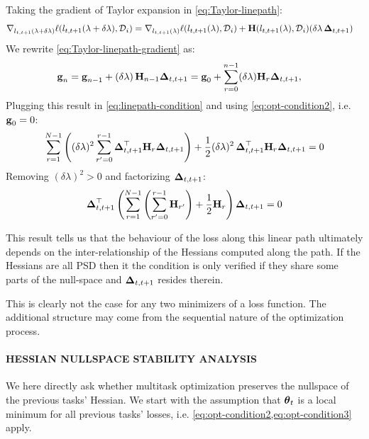 \documentclass{article} %
\newcommand{\hessian}{\vH}
\begin{document}
{Taking the gradient of Taylor expansion in \cref{eq:Taylor-linepath}:
\begin{align}
\label{eq:Taylor-linepath-gradient}
    \grad_{l_{t,t+1}(\lambda + \delta\lambda)}\loss(l_{t,t+1}(\lambda + \delta\lambda), \data_{i}) =
    & \hspace{3pt} \grad_{l_{t,t+1}(\lambda)}\loss(l_{t,t+1}(\lambda), \data_{i}) + \hessian(l_{t,t+1}(\lambda), \data_{i})(\delta\lambda\,\vDelta_{t,t+1})
\end{align}
We rewrite \cref{eq:Taylor-linepath-gradient} as:
\begin{align}
    \vg_n 
    &=  \vg_{n-1} + (\delta\lambda)\,\hessian_{n-1}\vDelta_{t,t+1} = \vg_0 + \sum_{r=0}^{n-1} (\delta\lambda)\hessian_r\vDelta_{t,t+1},
\end{align}
Plugging this result in \cref{eq:linepath-condition} and using \cref{eq:opt-condition2}, i.e. $\mbox{$\mbox{$\mathbf{g}$}$}_0=0$:
\begin{align}
    \sum_{r=1}^{N-1} \rnd{(\delta\lambda)^2 \sum_{r'=0}^{r-1} \vDelta_{t,t+1}^\top\hessian_r\vDelta_{t,t+1}} + \frac{1}{2}(\delta\lambda)^2\,\vDelta_{t,t+1}^\top\hessian_r\vDelta_{t,t+1} = 0
\end{align}
Removing $(\delta\lambda)^2>0$ and factorizing $\mbox{$\mbox{$\boldsymbol{\Delta}$}$}_{t,t+1}$:
\begin{align}
    \vDelta_{t,t+1}^\top \rnd{ \sum_{r=1}^{N-1} \rnd{ \sum_{r'=0}^{r-1} \hessian_{r'}} + \frac{1}{2}\hessian_r} \vDelta_{t,t+1} = 0
\end{align}
}

This result tells us that the behaviour of the loss along this linear path ultimately depends on the inter-relationship of the Hessians computed along the path. If the Hessians are all PSD then it the condition is only verified if they share some parts of the null-space and $\mbox{$\mbox{$\boldsymbol{\Delta}$}$}_{t,t+1}$ resides therein.

This is clearly not the case for any two minimizers of a loss function. The additional structure may come from the sequential nature of the optimization process. 



\paragraph{HESSIAN NULLSPACE STABILITY ANALYSIS}
We here directly ask whether multitask optimization preserves the nullspace of the previous tasks' Hessian. We start with the assumption that $\mbox{$\mbox{$\boldsymbol{\theta}$}$}_t$ is a local minimum for all previous tasks' losses, i.e. \cref{eq:opt-condition2,eq:opt-condition3} apply. 
\end{document}
